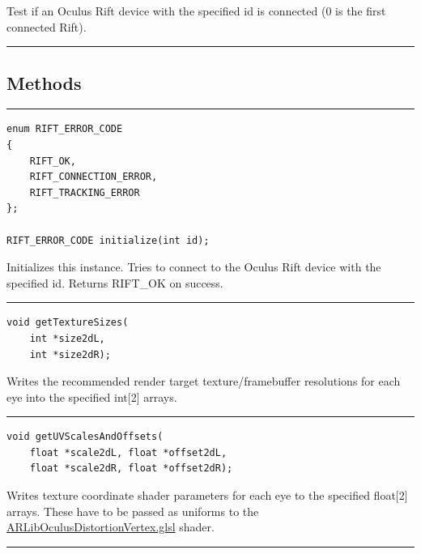 \documentclass[]{article}
\begin{document}
Test if an Oculus Rift device with the specified id is connected (0 is
the first connected Rift).

\begin{center}\rule{0.5\linewidth}{\linethickness}\end{center}

\subsection{Methods}\label{methods}

\begin{center}\rule{0.5\linewidth}{\linethickness}\end{center}

\begin{verbatim}
enum RIFT_ERROR_CODE
{
    RIFT_OK,
    RIFT_CONNECTION_ERROR,
    RIFT_TRACKING_ERROR
};

RIFT_ERROR_CODE initialize(int id);
\end{verbatim}

Initializes this instance. Tries to connect to the Oculus Rift device
with the specified id. Returns RIFT\_OK on success.

\begin{center}\rule{0.5\linewidth}{\linethickness}\end{center}

\begin{verbatim}
void getTextureSizes(
    int *size2dL,
    int *size2dR);
\end{verbatim}

Writes the recommended render target texture/framebuffer resolutions for
each eye into the specified int{[}2{]} arrays.

\begin{center}\rule{0.5\linewidth}{\linethickness}\end{center}

\begin{verbatim}
void getUVScalesAndOffsets(
    float *scale2dL, float *offset2dL,
    float *scale2dR, float *offset2dR);
\end{verbatim}

Writes texture coordinate shader parameters for each eye to the
specified float{[}2{]} arrays. These have to be passed as uniforms to
the
\href{https://github.com/ands/OculusMeetsAR/blob/master/ARLib/ogre_media/ARLibOculusDistortionVertex.glsl}{ARLibOculusDistortionVertex.glsl}
shader.

\begin{center}\rule{0.5\linewidth}{\linethickness}\end{center}
\end{document}
